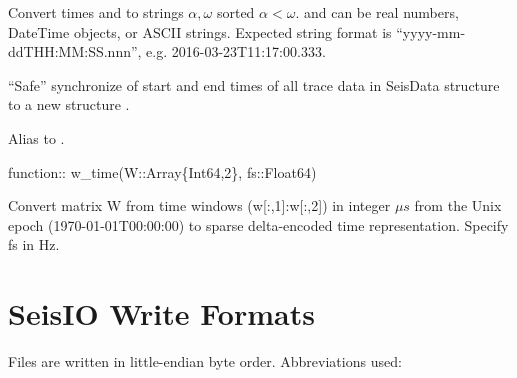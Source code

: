 \documentclass[letterpaper,11pt,english]{sphinxmanual}
\begin{document}
Convert times  and  to strings \(\alpha, \omega\) sorted \(\alpha < \omega\).
 and  can be real numbers, DateTime objects, or ASCII strings.
Expected string format is “yyyy-mm-ddTHH:MM:SS.nnn”, e.g. 2016-03-23T11:17:00.333.

“Safe” synchronize of start and end times of all trace data in SeisData structure  to a new structure .

\begin{fulllineitems}
\label{\detokenize{src/Appendices/function_list:u2d}}
\end{fulllineitems}


Alias to .

function:: w\_time(W::Array\{Int64,2\}, fs::Float64)

Convert matrix W from time windows (w{[}:,1{]}:w{[}:,2{]}) in integer \(\mu s\) from the Unix epoch (1970-01-01T00:00:00) to sparse delta-encoded time representation. Specify fs in Hz.


\section{SeisIO Write Formats}
\label{\detokenize{src/Appendices/seisio_file_format:seisio-write-formats}}\label{\detokenize{src/Appendices/seisio_file_format:seisio-file-format}}\label{\detokenize{src/Appendices/seisio_file_format::doc}}
Files are written in little-endian byte order. Abbreviations used:
\end{document}
